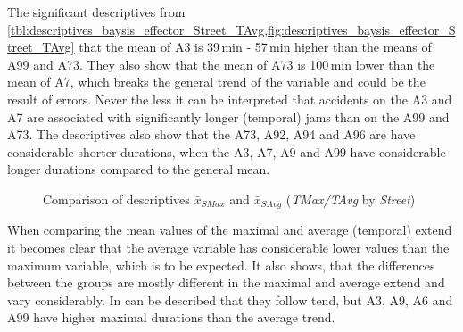 The significant descriptives from \cref{tbl:descriptives_baysis_effector_Street_TAvg,fig:descriptives_baysis_effector_Street_TAvg} that the mean of A3 is 39\,min - 57\,min higher than the means of A99 and A73. They also show that the mean of A73 is 100\,min lower than the mean of A7, which breaks the general trend of the variable and could be the result of errors. Never the less it can be interpreted that accidents on the A3 and A7 are associated with significantly longer (temporal) jams than on the A99 and A73. The descriptives also show that the A73, A92, A94 and A96 are have considerable shorter durations, when the A3, A7, A9 and A99 have considerable longer durations compared to the general mean.
\begin{figure}[ht!]
	\data 
	\pgfplotstablesort[sort key=meanTAvg, sort cmp=float >]{\datasorted}{\data}
	\tiny
	\centering
	\caption{Comparison of descriptives $\bar{x}_{SMax}$ and $\bar{x}_{SAvg}$ (\textit{TMax/TAvg} by \textit{Street})}
	\label{fig:baysis_effector_meancomparison_Str_spatial}
\end{figure}
When comparing the mean values of the maximal and average (temporal) extend it becomes clear that the average variable has considerable lower values than the maximum variable, which is to be expected. It also shows, that the differences between the groups are mostly different in the maximal and average extend and vary considerably. In can be described that they follow tend, but A3, A9, A6 and A99 have higher maximal durations than the average trend.

